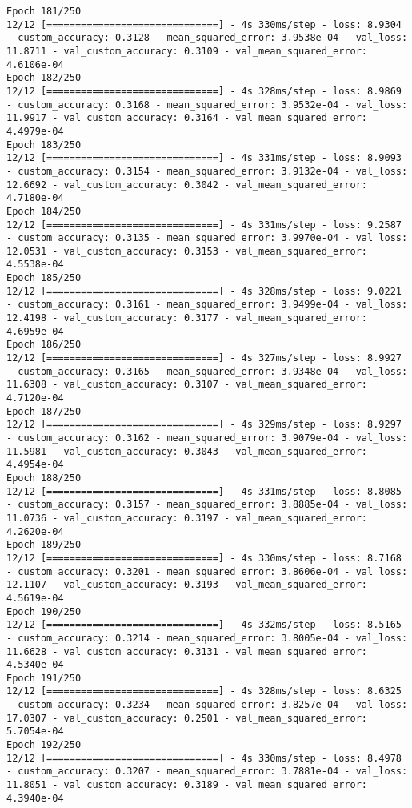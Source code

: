\begin{lstlisting}
Epoch 181/250
12/12 [==============================] - 4s 330ms/step - loss: 8.9304 - custom_accuracy: 0.3128 - mean_squared_error: 3.9538e-04 - val_loss: 11.8711 - val_custom_accuracy: 0.3109 - val_mean_squared_error: 4.6106e-04
Epoch 182/250
12/12 [==============================] - 4s 328ms/step - loss: 8.9869 - custom_accuracy: 0.3168 - mean_squared_error: 3.9532e-04 - val_loss: 11.9917 - val_custom_accuracy: 0.3164 - val_mean_squared_error: 4.4979e-04
Epoch 183/250
12/12 [==============================] - 4s 331ms/step - loss: 8.9093 - custom_accuracy: 0.3154 - mean_squared_error: 3.9132e-04 - val_loss: 12.6692 - val_custom_accuracy: 0.3042 - val_mean_squared_error: 4.7180e-04
Epoch 184/250
12/12 [==============================] - 4s 331ms/step - loss: 9.2587 - custom_accuracy: 0.3135 - mean_squared_error: 3.9970e-04 - val_loss: 12.0531 - val_custom_accuracy: 0.3153 - val_mean_squared_error: 4.5538e-04
Epoch 185/250
12/12 [==============================] - 4s 328ms/step - loss: 9.0221 - custom_accuracy: 0.3161 - mean_squared_error: 3.9499e-04 - val_loss: 12.4198 - val_custom_accuracy: 0.3177 - val_mean_squared_error: 4.6959e-04
Epoch 186/250
12/12 [==============================] - 4s 327ms/step - loss: 8.9927 - custom_accuracy: 0.3165 - mean_squared_error: 3.9348e-04 - val_loss: 11.6308 - val_custom_accuracy: 0.3107 - val_mean_squared_error: 4.7120e-04
Epoch 187/250
12/12 [==============================] - 4s 329ms/step - loss: 8.9297 - custom_accuracy: 0.3162 - mean_squared_error: 3.9079e-04 - val_loss: 11.5981 - val_custom_accuracy: 0.3043 - val_mean_squared_error: 4.4954e-04
Epoch 188/250
12/12 [==============================] - 4s 331ms/step - loss: 8.8085 - custom_accuracy: 0.3157 - mean_squared_error: 3.8885e-04 - val_loss: 11.0736 - val_custom_accuracy: 0.3197 - val_mean_squared_error: 4.2620e-04
Epoch 189/250
12/12 [==============================] - 4s 330ms/step - loss: 8.7168 - custom_accuracy: 0.3201 - mean_squared_error: 3.8606e-04 - val_loss: 12.1107 - val_custom_accuracy: 0.3193 - val_mean_squared_error: 4.5619e-04
Epoch 190/250
12/12 [==============================] - 4s 332ms/step - loss: 8.5165 - custom_accuracy: 0.3214 - mean_squared_error: 3.8005e-04 - val_loss: 11.6628 - val_custom_accuracy: 0.3131 - val_mean_squared_error: 4.5340e-04
Epoch 191/250
12/12 [==============================] - 4s 328ms/step - loss: 8.6325 - custom_accuracy: 0.3234 - mean_squared_error: 3.8257e-04 - val_loss: 17.0307 - val_custom_accuracy: 0.2501 - val_mean_squared_error: 5.7054e-04
Epoch 192/250
12/12 [==============================] - 4s 330ms/step - loss: 8.4978 - custom_accuracy: 0.3207 - mean_squared_error: 3.7881e-04 - val_loss: 11.8051 - val_custom_accuracy: 0.3189 - val_mean_squared_error: 4.3940e-04

\end{lstlisting}
